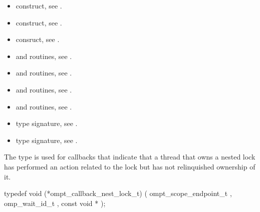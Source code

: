 \crossreferences
\begin{itemize}
\item {} construct, see .

\item {} construct, see .

\item {} consruct, see .

\item {} and  routines,
see .

\item {} and  routines,
see .

\item {} and  routines,
see .

\item {} and  routines,
see .

\item {} type signature, see .

\item {} type signature, see .
\end{itemize}



\label{sec:ompt_callback_nest_lock_t}
\summary
The  type is used for callbacks that 
indicate that a thread that owns a nested lock has performed an action 
related to the lock but has not relinquished ownership of it.

\format
\begin{ccppspecific}
\begin{omptCallback}
typedef void (*ompt_callback_nest_lock_t) (
  ompt_scope_endpoint_t ,
  omp_wait_id_t ,
  const void *
);
\end{omptCallback}
\end{ccppspecific}


